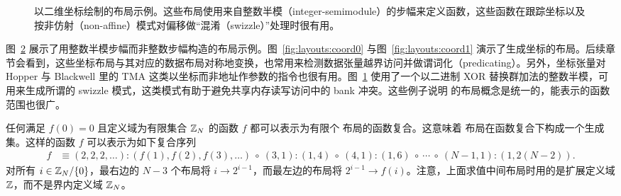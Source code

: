\begin{figure}[ht]
\begin{subfigure}[t]{0.45\textwidth}
    \label{fig:layouts:swizzle}
\end{subfigure}
\caption{以二维坐标绘制的布局示例。这些布局使用来自整数半模（integer-semimodule）的步幅来定义函数，这些函数在跟踪坐标以及按非仿射（non-affine）模式对偏移做“混淆（swizzle）”处理时很有用。}
\label{fig:layouts2}
\end{figure}

图~\ref{fig:layouts2} 展示了用整数半模步幅而非整数步幅构造的布局示例。图~\ref{fig:layouts:coord0} 与图~\ref{fig:layouts:coord1} 演示了生成坐标的布局。后续章节会看到，这些坐标布局与其对应的数据布局对称地变换，也常用来检测数据张量越界访问并做谓词化（predicating）。另外，坐标张量对 Hopper 与 Blackwell 里的 TMA 这类以坐标而非地址作参数的指令也很有用。图~\ref{fig:layouts:swizzle} 使用了一个以二进制 XOR 替换群加法的整数半模，可用来生成所谓的 swizzle 模式，这类模式有助于避免共享内存读写访问中的 bank 冲突。这些例子说明 \CuTe 的布局概念是统一的，能表示的函数范围也很广。


任何满足 $f(0) = 0$ 且定义域为有限集合 $\mathbb{Z}_N$ 的函数 $f$ 都可以表示为有限个 \CuTe 布局的函数复合。这意味着 \CuTe 布局在函数复合下构成一个生成集。这样的函数 $f$ 可以表示为如下复合序列
\begin{align*}
f &\equiv (2,2,2,\ldots):(f(1),f(2),f(3),\ldots) \ \circ \ (3,1):(1,4) \ \circ \ (4,1):(1,6) \ \circ \ \cdots \ \circ \ (N-1,1):(1,2(N-2)).
\end{align*}
对所有 $i \in \mathbb{Z}_N / \{0\}$，最右边的 $N-3$ 个布局将 $i \to 2^{i-1}$，而最左边的布局将 $2^{i-1} \to f(i)$。注意，上面求值中间布局时用的是扩展定义域 $\mathbb{Z}$，而不是界内定义域 $\mathbb{Z}_N$。

